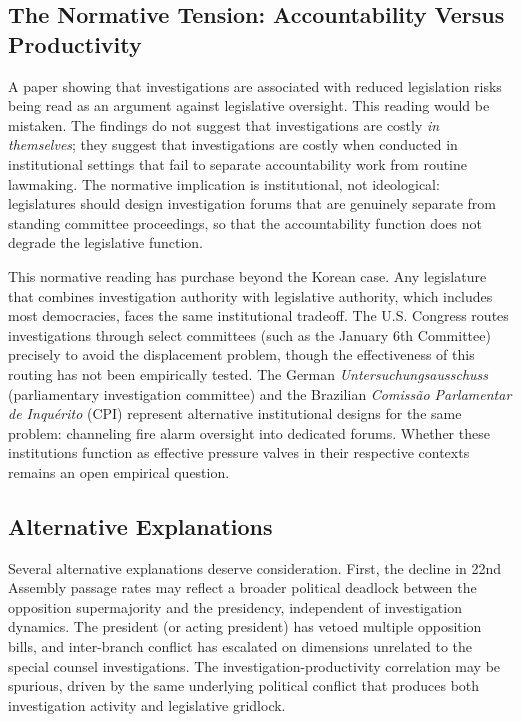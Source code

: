 \documentclass[11pt]{article}
\begin{document}
\subsection{The Normative Tension: Accountability Versus Productivity}

A paper showing that investigations are associated with reduced legislation risks being read as an argument against legislative oversight. This reading would be mistaken. The findings do not suggest that investigations are costly \textit{in themselves}; they suggest that investigations are costly when conducted in institutional settings that fail to separate accountability work from routine lawmaking. The normative implication is institutional, not ideological: legislatures should design investigation forums that are genuinely separate from standing committee proceedings, so that the accountability function does not degrade the legislative function.

This normative reading has purchase beyond the Korean case. Any legislature that combines investigation authority with legislative authority, which includes most democracies, faces the same institutional tradeoff. The U.S. Congress routes investigations through select committees (such as the January 6th Committee) precisely to avoid the displacement problem, though the effectiveness of this routing has not been empirically tested. The German \textit{Untersuchungsausschuss} (parliamentary investigation committee) and the Brazilian \textit{Comiss\~ao Parlamentar de Inqu\'erito} (CPI) represent alternative institutional designs for the same problem: channeling fire alarm oversight into dedicated forums. Whether these institutions function as effective pressure valves in their respective contexts remains an open empirical question.

\subsection{Alternative Explanations}

Several alternative explanations deserve consideration. First, the decline in 22nd Assembly passage rates may reflect a broader political deadlock between the opposition supermajority and the presidency, independent of investigation dynamics. The president (or acting president) has vetoed multiple opposition bills, and inter-branch conflict has escalated on dimensions unrelated to the special counsel investigations. The investigation-productivity correlation may be spurious, driven by the same underlying political conflict that produces both investigation activity and legislative gridlock.
\end{document}

